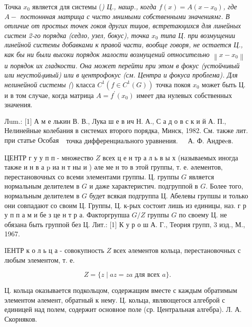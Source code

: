 \documentclass[10pt]{article}
\begin{document}
Точка $x_{0}$ является для системы (\textit{) Ц., нашр., когда $f(x)=A\left(x-x_{0}\right)$, где $A-$ постоннная матрица с чисто мнимыми собственными значениямг. В отличие от простых точек гокоя других тиџов, встретаюџихся для линейных систем 2-го порядка (седло, узел, бокус), точка $x_{0}$ типа Ц. при возмущении линейной системы добавками к правой части, вообще говоря, не остается Ц., как бы ни были высоки порядок малости возмущений относительно $\left\|x-x_{0}\right\|$ и порядок их гладкости. Она может перейти при этом в фокус (устойчивый или неустойqивый) или в центрофокус (см. Центра и фокуса проблема). Для нелинейной системы (}) класса $C^{1}\left(f \in C^{1}(G)\right)$ точка покоя $x_{0}$ может быть Ц. и в том случае, когда матрица $A=f^{\prime}\left(x_{0}\right)$ имеет два нулевых собственных значения.



Лum.: [1] А м е лькин В. В., Лука ш е в ич Н. А., С а д о в с к и й А. П., Нелинейные колебания в системах второго порядка, Минск, 1982. См. также лит. при статье Особая $\begin{array}{ll}\text { точка дифференциального уравнения. } & \text { А. Ф. Андреeв. }\end{array}$



ЦЕНТР г у у п п - множество $Z$ всех ц е н тр а л ь в ы х (называемых иногда также и н в а p иа н т ны и ) әле ме н то в этой группы, т. е. әлементов, перестановочных со всеми элементами группы. Ц. группы $G$ является нормальным делителем в $G$ и даже характеристич. подгруппой в $G$. Более того, нормальным делителем в $G$ будет всякая подгруппа Ц. Абелевы групшы и только они совпадают со своим Ц. Группы, Ц. к-рых состоит лишь из единицы, наз. г р у п п а м и бе з це н т р а. Факторгрупша $G / Z$ группы $G$ по своему Ц. не обязана быть группой без Ц. Лит.: [1] К у р о ш А. Г., Теория групп, 3 изд., М., 1967.



IЕНТР к о л ь ц а - совокупность $Z$ всех әлементов кольца, перестановочных с любым элементом, т. е.



\[

Z=\{z \mid a z=z a \text { для всех } a\} .

\]



Ц. кольца оказывается подкольцом, содержащим вместе с каждым обратимым элементом әлемент, обратный к нему. Ц. кольца, являющегося алгеброй с единицей над полем, содержит основное поле (ср. Центральная алгебра). Л. А. Скорняков.
\end{document}
